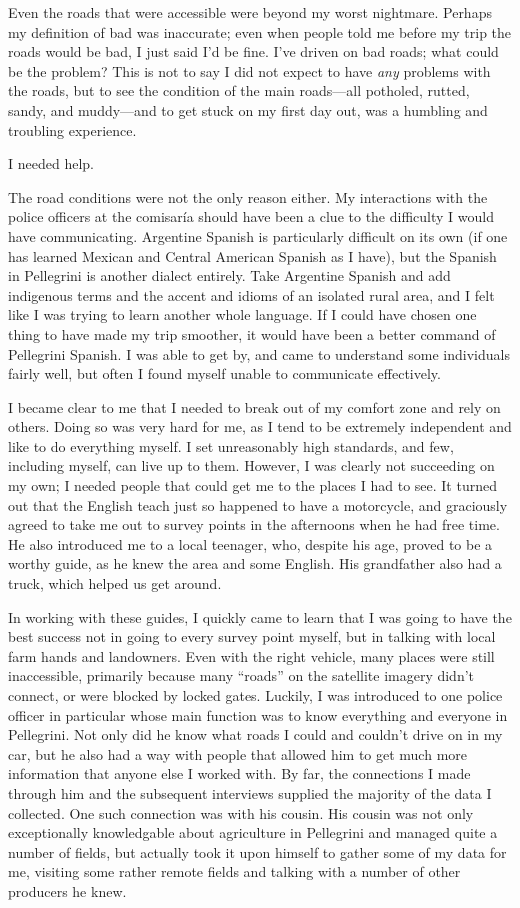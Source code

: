 Even the roads that were accessible were beyond my worst nightmare. Perhaps my definition of bad was inaccurate; even when people told me before my trip the roads would be bad, I just said I’d be fine. I’ve driven on bad roads; what could be the problem? This is not to say I did not expect to have \textit{any} problems with the roads, but to see the condition of the main roads—all potholed, rutted, sandy, and muddy—and to get stuck on my first day out, was a humbling and troubling experience.

I needed help.

The road conditions were not the only reason either. My interactions with the police officers at the comisaría should have been a clue to the difficulty I would have communicating. Argentine Spanish is particularly difficult on its own (if one has learned Mexican and Central American Spanish as I have), but the Spanish in Pellegrini is another dialect entirely. Take Argentine Spanish and add indigenous terms and the accent and idioms of an isolated rural area, and I felt like I was trying to learn another whole language. If I could have chosen one thing to have made my trip smoother, it would have been a better command of Pellegrini Spanish. I was able to get by, and came to understand some individuals fairly well, but often I found myself unable to communicate effectively.

I became clear to me that I needed to break out of my comfort zone and rely on others. Doing so was very hard for me, as I tend to be extremely independent and like to do everything myself. I set unreasonably high standards, and few, including myself, can live up to them. However, I was clearly not succeeding on my own; I needed people that could get me to the places I had to see. It turned out that the English teach just so happened to have a motorcycle, and graciously agreed to take me out to survey points in the afternoons when he had free time. He also introduced me to a local teenager, who, despite his age, proved to be a worthy guide, as he knew the area and some English. His grandfather also had a truck, which helped us get around.

In working with these guides, I quickly came to learn that I was going to have the best success not in going to every survey point myself, but in talking with local farm hands and landowners. Even with the right vehicle, many places were still inaccessible, primarily because many “roads” on the satellite imagery didn’t connect, or were blocked by locked gates. Luckily, I was introduced to one police officer in particular whose main function was to know everything and everyone in Pellegrini. Not only did he know what roads I could and couldn’t drive on in my car, but he also had a way with people that allowed him to get much more information that anyone else I worked with. By far, the connections I made through him and the subsequent interviews supplied the majority of the data I collected. One such connection was with his cousin. His cousin was not only exceptionally knowledgable about agriculture in Pellegrini and managed quite a number of fields, but actually took it upon himself to gather some of my data for me, visiting some rather remote fields and talking with a number of other producers he knew.

